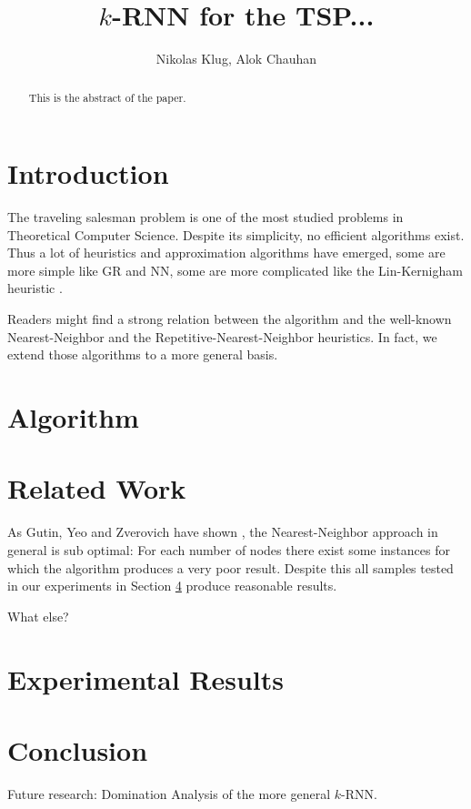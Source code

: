 \documentclass[11pt]{article}
\title{$k$-RNN for the TSP...}
\author{Nikolas Klug, Alok Chauhan}
\begin{document}
	\maketitle
	\begin{abstract}
		This is the abstract of the paper.
	\end{abstract}

	\section{Introduction}
	\label{sec:introduction}
	The traveling salesman problem is one of the most studied problems in Theoretical Computer Science. 
	Despite its simplicity, no efficient algorithms exist. 
	Thus a lot of heuristics and approximation algorithms have emerged, some are more simple like GR and NN, some are more complicated like the Lin-Kernigham heuristic \cite{LIN1973}.
	
	Readers might find a strong relation between the algorithm and the well-known Nearest-Neighbor and the Repetitive-Nearest-Neighbor heuristics. 
	In fact, we extend those algorithms to a more general basis.
	
	\section{Algorithm}
	\label{sec:algorithm}
	
	
	\section{Related Work}
	\label{sec:related}
	
	As Gutin, Yeo and Zverovich have shown \cite{GUTIN2002}, the Nearest-Neighbor approach in general is sub optimal: 
	For each number of nodes there exist some instances for which the algorithm produces a very poor result. 
	Despite this all samples tested in our experiments in Section \ref{sec:experimental} produce reasonable results.
	
	What else?
	\section{Experimental Results}
	\label{sec:experimental}
	
	

	
	\section{Conclusion}
	\label{sec:conclusion}
	
	Future research: Domination Analysis of the more general $k$-RNN.
	
	
	
	
\end{document}
